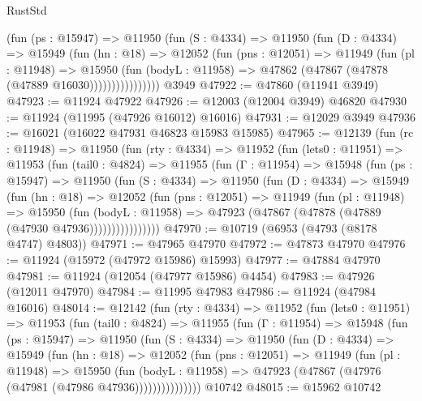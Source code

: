 \begin{lexlean}{RustStd}
\begin{coremodule}
{\begin{coremodule}
{{{{{{{{{{{{{{{{{{{{{{{{{{{{{{{{{{{{{{{{{{{{{{{{{{{{{{{{{{{{{{{{{{{{{{{{{{{{{{{{                (fun (ps : @15947) =>
                @11950
                  (fun (S : @4334) =>
                  @11950
                    (fun (D : @4334) =>
                    @15949
                      (fun (hn : @18) =>
                      @12052
                        (fun (pns : @12051) =>
                        @11949
                          (fun (pl : @11948) =>
                          @15950
                            (fun (bodyL : @11958) =>
                            @47862 (@47867 (@47878 (@47889 @16030))))))))))))))))
    @3949
@47922 := @47860 (@11941 @3949)
@47923 := @11924 @47922
@47926 := @12003 (@12004 @3949) @46820
@47930 := @11924 (@11995 (@47926 @16012) @16016)
@47931 := @12029 @3949
@47936 := @16021 (@16022 @47931 @46823 @15983 @15985)
@47965 := @12139
    (fun (rc : @11948) =>
    @11950
      (fun (rty : @4334) =>
      @11952
        (fun (lets0 : @11951) =>
        @11953
          (fun (tail0 : @4824) =>
          @11955
            (fun (Γ : @11954) =>
            @15948
              (fun (ps : @15947) =>
              @11950
                (fun (S : @4334) =>
                @11950
                  (fun (D : @4334) =>
                  @15949
                    (fun (hn : @18) =>
                    @12052
                      (fun (pns : @12051) =>
                      @11949
                        (fun (pl : @11948) =>
                        @15950
                          (fun (bodyL : @11958) =>
                          @47923 (@47867 (@47878 (@47889 (@47930 @47936))))))))))))))))
@47970 := @10719 (@6953 (@4793 (@8178 @4747) @4803))
@47971 := @47965 @47970
@47972 := @47873 @47970
@47976 := @11924 (@15972 (@47972 @15986) @15993)
@47977 := @47884 @47970
@47981 := @11924 (@12054 (@47977 @15986) @4454)
@47983 := @47926 (@12011 @47970)
@47984 := @11995 @47983
@47986 := @11924 (@47984 @16016)
@48014 := @12142
    (fun (rty : @4334) =>
    @11952
      (fun (lets0 : @11951) =>
      @11953
        (fun (tail0 : @4824) =>
        @11955
          (fun (Γ : @11954) =>
          @15948
            (fun (ps : @15947) =>
            @11950
              (fun (S : @4334) =>
              @11950
                (fun (D : @4334) =>
                @15949
                  (fun (hn : @18) =>
                  @12052
                    (fun (pns : @12051) =>
                    @11949
                      (fun (pl : @11948) =>
                      @15950
                        (fun (bodyL : @11958) =>
                        @47923 (@47867 (@47976 (@47981 (@47986 @47936)))))))))))))))
    @10742
@48015 := @15962 @10742
}}}}}}}}}}}}}}}}}}}}}}}}}}}}}}}}}}}}}}}}}}}}}}}}}}}}}}}}}}}}}}}}}}}}}}}}}}}}}}}}
\end{coremodule}}
\end{coremodule}
\end{lexlean}
